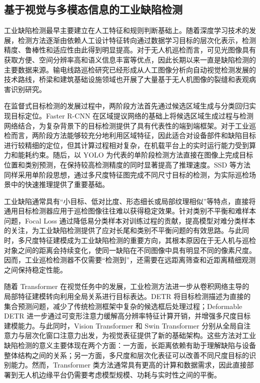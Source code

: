 \subsection{基于视觉与多模态信息的工业缺陷检测}

工业缺陷检测最早主要建立在人工特征和规则判断基础上。随着深度学习技术的发展，检测方法逐渐由依赖人工设计特征转向通过数据学习目标的层次化表示，检测精度、鲁棒性和适应性由此得到明显提高\cite{taox2021survey}。对于无人机巡检而言，可见光图像具有获取方便、空间分辨率高和语义信息丰富等优点，因此长期以来一直是缺陷检测的主要数据来源。输电线路巡检研究已经形成从人工图像分析向自动视觉检测发展的技术路线，桥梁和建筑基础设施领域也开展了大量基于无人机图像的裂缝和表观病害识别研究\cite{nguyen2018automatic,miao2020uav,yeum2015vision,cha2017deep,liu2020image}。

在监督式目标检测的发展过程中，两阶段方法首先通过候选区域生成与分类回归实现目标定位。Faster R-CNN 在区域提议网络的基础上将候选区域生成过程与检测网络结合，为复杂背景下的目标检测提供了具有代表性的端到端框架\cite{ren2015faster}。对于工业巡检而言，两阶段方法能够较充分地利用区域特征，因此适合对设备部件和缺陷目标进行较精细的定位，但其计算过程相对复杂，在机载平台上的实时运行能力受到算力和能耗约束。随后，以 YOLO 为代表的单阶段检测方法直接在图像上完成目标位置和类别预测，在保持较高检测精度的同时显著提高了推理速度\cite{redmon2016you,redmon2017yolo9000,redmon2018yolov3,bochkovskiy2020yolov4,wang2023yolov7}。SSD 等方法同样采用单阶段思想，通过多尺度特征图完成不同尺寸目标的检测，为实际巡检场景中的快速推理提供了重要基础\cite{liu2016ssd}。

工业缺陷通常具有“小目标、低对比度、形态细长或局部纹理相似”等特点，直接将通用目标检测器应用于巡检图像往往难以获得稳定效果。针对类别不平衡和难样本问题，Focal Loss 通过降低易分类样本对训练过程的贡献，提高模型对难分类样本的关注，为工业缺陷检测提供了应对长尾和类别不平衡问题的有效思路\cite{lin2017focal}。与此同时，多尺度特征建模成为工业缺陷检测的重要方向，其根本原因在于无人机与巡检对象之间的距离会持续变化，使同一缺陷在不同图像中具有明显不同的像素尺度。因而，工业巡检检测器不仅需要“检测到”，还需要在远距离筛查和近距离精细观测之间保持稳定性能。

随着 Transformer 在视觉任务中的发展，工业检测方法进一步从卷积网络主导的局部特征建模转向利用全局关系进行目标表达。DETR 将目标检测描述为直接的集合预测问题，减少了传统检测框架中复杂的候选框后处理过程\cite{carion2020end}；Deformable DETR 进一步通过可变形注意力缓解高分辨率特征计算开销，并增强多尺度目标建模能力\cite{zhu2021deformable}。与此同时，Vision Transformer 和 Swin Transformer 分别从全局自注意力与层次化窗口注意力出发，为视觉表征提供了新的基础架构\cite{dosovitskiy2021image,liu2021swin,vaswani2017attention}。这些方法对工业缺陷检测的意义主要体现在两个方面：一方面，长距离依赖有助于理解缺陷与设备整体结构之间的关系；另一方面，多尺度和层次化表征可以改善不同尺度目标的识别能力。然而，Transformer 类方法通常具有更高的计算和数据需求，因此直接部署到无人机边缘平台仍需要考虑模型规模、功耗与实时性之间的平衡。

